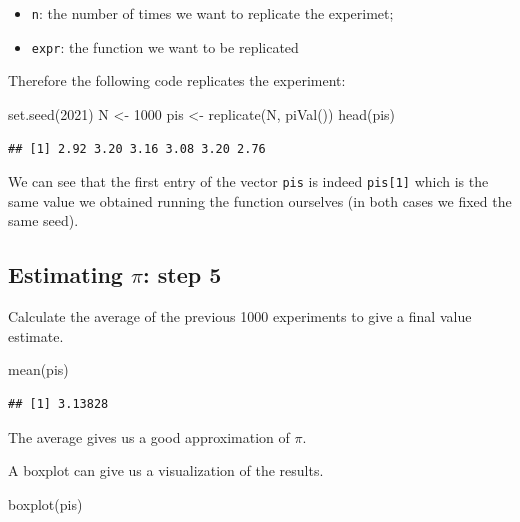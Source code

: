 \documentclass[
]{book}
\newenvironment{Shaded}{\begin{snugshade}}{\end{snugshade}}
\newcommand{\DecValTok}[1]{\textcolor[rgb]{0.00,0.00,0.81}{#1}}
\newcommand{\FunctionTok}[1]{\textcolor[rgb]{0.00,0.00,0.00}{#1}}
\newcommand{\NormalTok}[1]{#1}
\newcommand{\OtherTok}[1]{\textcolor[rgb]{0.56,0.35,0.01}{#1}}
\theoremstyle{definition}
\theoremstyle{definition}
\theoremstyle{definition}
\theoremstyle{definition}
\theoremstyle{remark}
\begin{document}
\begin{itemize}
\item
  \texttt{n}: the number of times we want to replicate the experimet;
\item
  \texttt{expr}: the function we want to be replicated
\end{itemize}

Therefore the following code replicates the experiment:

\begin{Shaded}
\begin{Highlighting}[]
\FunctionTok{set.seed}\NormalTok{(}\DecValTok{2021}\NormalTok{)}
\NormalTok{N }\OtherTok{\textless{}{-}} \DecValTok{1000}
\NormalTok{pis }\OtherTok{\textless{}{-}} \FunctionTok{replicate}\NormalTok{(N, }\FunctionTok{piVal}\NormalTok{())}
\FunctionTok{head}\NormalTok{(pis)}
\end{Highlighting}
\end{Shaded}

\begin{verbatim}
## [1] 2.92 3.20 3.16 3.08 3.20 2.76
\end{verbatim}

We can see that the first entry of the vector \texttt{pis} is indeed \texttt{pis{[}1{]}} which is the same value we obtained running the function ourselves (in both cases we fixed the same seed).

\hypertarget{estimating-pi-step-5}{%
\subsection{\texorpdfstring{Estimating \(\pi\): step 5}{Estimating \textbackslash pi: step 5}}\label{estimating-pi-step-5}}

Calculate the average of the previous 1000 experiments to give a final value estimate.

\begin{Shaded}
\begin{Highlighting}[]
\FunctionTok{mean}\NormalTok{(pis)}
\end{Highlighting}
\end{Shaded}

\begin{verbatim}
## [1] 3.13828
\end{verbatim}

The average gives us a good approximation of \(\pi\).

A boxplot can give us a visualization of the results.

\begin{Shaded}
\begin{Highlighting}[]
\FunctionTok{boxplot}\NormalTok{(pis)}
\end{Highlighting}
\end{Shaded}
\end{document}
